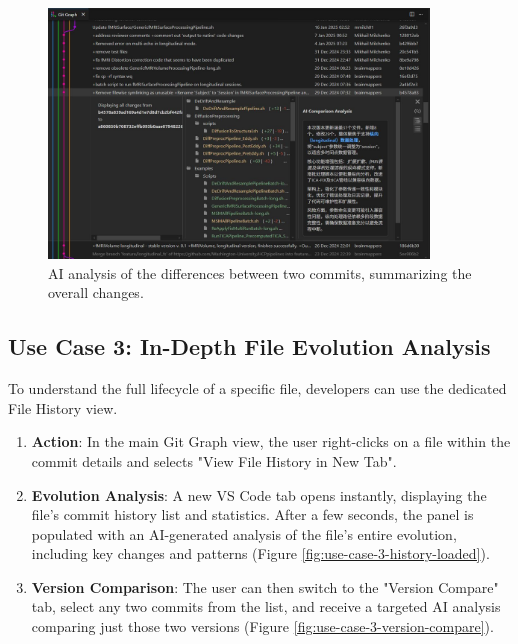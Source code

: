 \begin{figure}[h!]
    \centering
    \includegraphics[width=0.9\textwidth]{figures/use-case-2-comparison.jpg}
    \caption{AI analysis of the differences between two commits, summarizing the overall changes.}
    \label{fig:use-case-2-comparison}
\end{figure}

\subsection{Use Case 3: In-Depth File Evolution Analysis}
To understand the full lifecycle of a specific file, developers can use the dedicated File History view.

\begin{enumerate}
    \item \textbf{Action}: In the main Git Graph view, the user right-clicks on a file within the commit details and selects "View File History in New Tab".
    \item \textbf{Evolution Analysis}: A new VS Code tab opens instantly, displaying the file's commit history list and statistics. After a few seconds, the panel is populated with an AI-generated analysis of the file's entire evolution, including key changes and patterns (Figure \ref{fig:use-case-3-history-loaded}).
    \item \textbf{Version Comparison}: The user can then switch to the "Version Compare" tab, select any two commits from the list, and receive a targeted AI analysis comparing just those two versions (Figure \ref{fig:use-case-3-version-compare}).
\end{enumerate}


